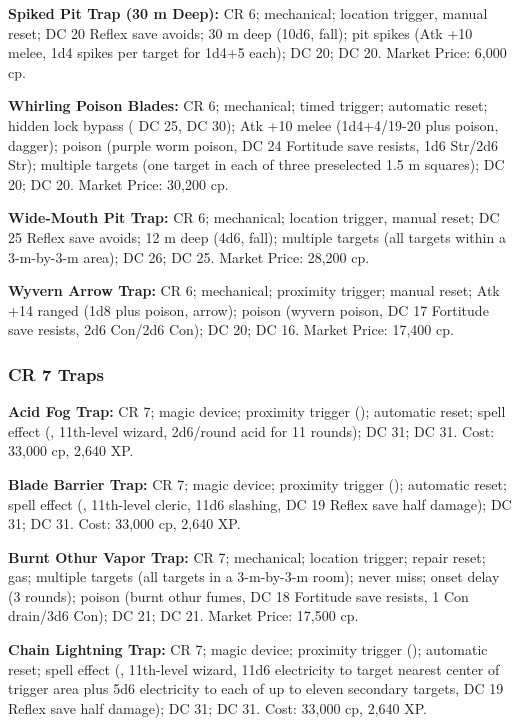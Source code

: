 \textbf{Spiked Pit Trap (30 m Deep):} CR 6; mechanical; location trigger, manual reset; DC 20 Reflex save avoids; 30 m deep (10d6, fall); pit spikes (Atk +10 melee, 1d4 spikes per target for 1d4+5 each);  DC 20;  DC 20. Market Price: 6,000 cp.

\textbf{Whirling Poison Blades:} CR 6; mechanical; timed trigger; automatic reset; hidden lock bypass ( DC 25,  DC 30); Atk +10 melee (1d4+4/19-20 plus poison, dagger); poison (purple worm poison, DC 24 Fortitude save resists, 1d6 Str/2d6 Str); multiple targets (one target in each of three preselected 1.5 m squares);  DC 20;  DC 20. Market Price: 30,200 cp.

\textbf{Wide-Mouth Pit Trap:} CR 6; mechanical; location trigger, manual reset; DC 25 Reflex save avoids; 12 m deep (4d6, fall); multiple targets (all targets within a 3-m-by-3-m area);  DC 26;  DC 25. Market Price: 28,200 cp.

\textbf{Wyvern Arrow Trap:} CR 6; mechanical; proximity trigger; manual reset; Atk +14 ranged (1d8 plus poison, arrow); poison (wyvern poison, DC 17 Fortitude save resists, 2d6 Con/2d6 Con);  DC 20;  DC 16. Market Price: 17,400 cp.

\subsubsection{CR 7 Traps}
\textbf{Acid Fog Trap:} CR 7; magic device; proximity trigger (); automatic reset; spell effect (, 11th-level wizard, 2d6/round acid for 11 rounds);  DC 31;  DC 31. Cost: 33,000 cp, 2,640 XP.

\textbf{Blade Barrier Trap:} CR 7; magic device; proximity trigger (); automatic reset; spell effect (, 11th-level cleric, 11d6 slashing, DC 19 Reflex save half damage);  DC 31;  DC 31. Cost: 33,000 cp, 2,640 XP.

\textbf{Burnt Othur Vapor Trap:} CR 7; mechanical; location trigger; repair reset; gas; multiple targets (all targets in a 3-m-by-3-m room); never miss; onset delay (3 rounds); poison (burnt othur fumes, DC 18 Fortitude save resists, 1 Con drain/3d6 Con);  DC 21;  DC 21. Market Price: 17,500 cp.

\textbf{Chain Lightning Trap:} CR 7; magic device; proximity trigger (); automatic reset; spell effect (, 11th-level wizard, 11d6 electricity to target nearest center of trigger area plus 5d6 electricity to each of up to eleven secondary targets, DC 19 Reflex save half damage);  DC 31;  DC 31. Cost: 33,000 cp, 2,640 XP.

